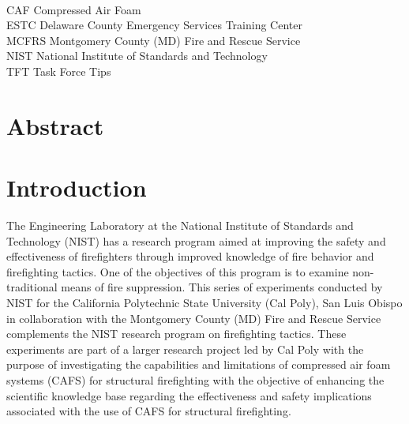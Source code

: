 \documentclass[12pt,oneside]{book}
\begin{document}
\begin{tabbing}
\hspace{1.5in} \= \\
CAF \> Compressed Air Foam \\
ESTC \> Delaware County Emergency Services Training Center \\
MCFRS \> Montgomery County (MD) Fire and Rescue Service \\
NIST \> National Institute of Standards and Technology \\
TFT \> Task Force Tips \\
\end{tabbing}

\mainmatter

\chapter*{\centering Abstract}


\chapter{Introduction}
\label{chap:Introduction}
\setcounter{page}{1}

The Engineering Laboratory at the National Institute of Standards and Technology (NIST) has a research program aimed at improving the safety and effectiveness of firefighters through improved knowledge of fire behavior and firefighting tactics. One of the objectives of this program is to examine non-traditional means of fire suppression. This series of experiments conducted by NIST for the California Polytechnic State University (Cal Poly), San Luis Obispo in collaboration with the Montgomery County (MD) Fire and Rescue Service complements the NIST research program on firefighting tactics. These experiments are part of a larger research project led by Cal Poly with the purpose of investigating the capabilities and limitations of compressed air foam systems (CAFS) for structural firefighting with the objective of enhancing the scientific knowledge base regarding the effectiveness and safety implications associated with the use of CAFS for structural firefighting.
\end{document}

